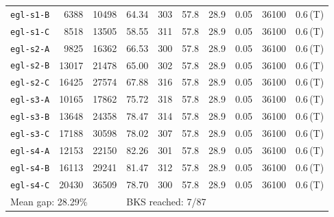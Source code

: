 \begin{longtable}{lrrrrrrrrl}
\texttt{egl-s1-B} & 6388 & 10498 & 64.34 & 303 & 57.8 & 28.9 & 0.05 & 36100 & 0.6\,(T) \\
\texttt{egl-s1-C} & 8518 & 13505 & 58.55 & 311 & 57.8 & 28.9 & 0.05 & 36100 & 0.6\,(T) \\
\texttt{egl-s2-A} & 9825 & 16362 & 66.53 & 300 & 57.8 & 28.9 & 0.05 & 36100 & 0.6\,(T) \\
\texttt{egl-s2-B} & 13017 & 21478 & 65.00 & 302 & 57.8 & 28.9 & 0.05 & 36100 & 0.6\,(T) \\
\texttt{egl-s2-C} & 16425 & 27574 & 67.88 & 316 & 57.8 & 28.9 & 0.05 & 36100 & 0.6\,(T) \\
\texttt{egl-s3-A} & 10165 & 17862 & 75.72 & 318 & 57.8 & 28.9 & 0.05 & 36100 & 0.6\,(T) \\
\texttt{egl-s3-B} & 13648 & 24358 & 78.47 & 314 & 57.8 & 28.9 & 0.05 & 36100 & 0.6\,(T) \\
\texttt{egl-s3-C} & 17188 & 30598 & 78.02 & 307 & 57.8 & 28.9 & 0.05 & 36100 & 0.6\,(T) \\
\texttt{egl-s4-A} & 12153 & 22150 & 82.26 & 301 & 57.8 & 28.9 & 0.05 & 36100 & 0.6\,(T) \\
\texttt{egl-s4-B} & 16113 & 29241 & 81.47 & 312 & 57.8 & 28.9 & 0.05 & 36100 & 0.6\,(T) \\
\texttt{egl-s4-C} & 20430 & 36509 & 78.70 & 300 & 57.8 & 28.9 & 0.05 & 36100 & 0.6\,(T) \\
\midrule
\multicolumn{3}{l}{Mean gap: 28.29\%} & \multicolumn{7}{l}{BKS reached: 7/87} \\
\end{longtable}
\endgroup